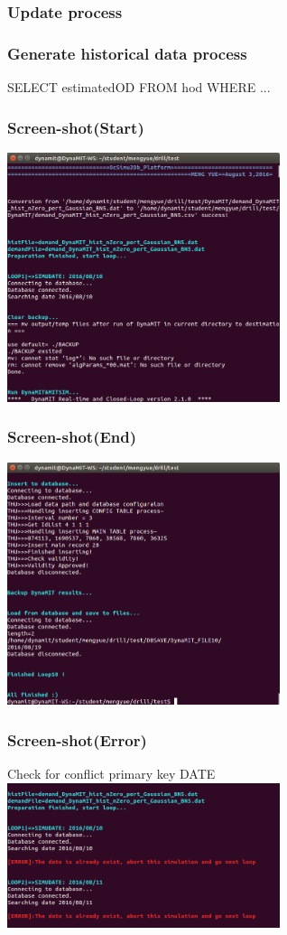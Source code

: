 \documentclass[12pt]{beamer}
\begin{document}
\begin{frame}
\frametitle{Update process}
\end{frame}

\begin{frame}
\frametitle{Generate historical data process}
SELECT estimatedOD FROM hod WHERE ...  
\end{frame}

\begin{frame}
\frametitle{Screen-shot(Start)}
\includegraphics[width = 0.6\textwidth]{screenshot_2.png}
\end{frame}

\begin{frame}
\frametitle{Screen-shot(End)}
\includegraphics[width = 0.6\textwidth]{screenshot_1.png}
\end{frame}

\begin{frame}
\frametitle{Screen-shot(Error)}
Check for conflict primary key DATE
\includegraphics[width = 0.6\textwidth]{screenshot_e.png}
\end{frame}
\end{document}
